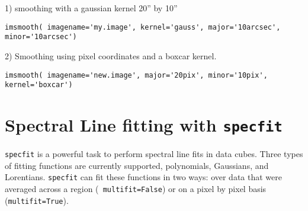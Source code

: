 1) smoothing with a gaussian kernel 20'' by 10''
\begin{verbatim}
imsmooth( imagename='my.image', kernel='gauss', major='10arcsec', minor='10arcsec')
\end{verbatim}


2) Smoothing using pixel coordinates and a boxcar kernel.
\begin{verbatim}
imsmooth( imagename='new.image', major='20pix', minor='10pix', kernel='boxcar')
\end{verbatim}


\section{Spectral Line fitting with {\tt specfit}}
\label{section:analysis.specfit}

{\tt specfit} is a powerful task to perform spectral line fits in data
cubes. Three types of fitting functions are currently supported,
polynomials, Gaussians, and Lorentians. {\tt specfit} can fit these functions in
two ways: over data that were averaged across a region ({\tt
  multifit=False}) or on a pixel
by pixel basis ({\tt multifit=True}). 


